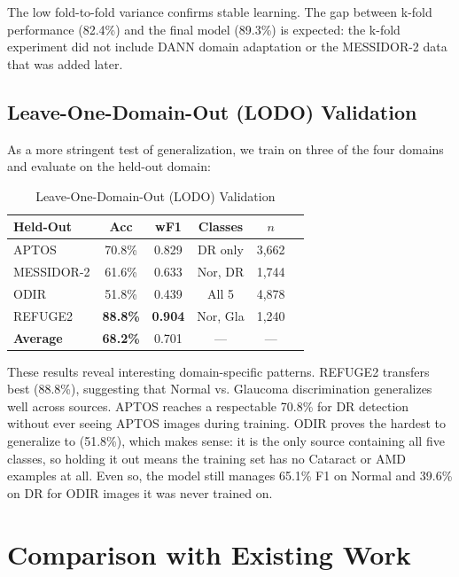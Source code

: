 \documentclass[conference]{IEEEtran}
\begin{document}
\noindent The low fold-to-fold variance confirms stable learning. The gap between k-fold performance (82.4\%) and the final model (89.3\%) is expected: the k-fold experiment did not include DANN domain adaptation or the MESSIDOR-2 data that was added later.

\subsection{Leave-One-Domain-Out (LODO) Validation}

As a more stringent test of generalization, we train on three of the four domains and evaluate on the held-out domain:

\begin{table}[h]
\centering
\caption{Leave-One-Domain-Out (LODO) Validation}
\label{tab:lodo}
\begin{tabular}{lccccr}
\toprule
\textbf{Held-Out} & \textbf{Acc} & \textbf{wF1} & \textbf{Classes} & \textbf{$n$} \\
\midrule
APTOS & 70.8\% & 0.829 & DR only & 3,662 \\
MESSIDOR-2 & 61.6\% & 0.633 & Nor, DR & 1,744 \\
ODIR & 51.8\% & 0.439 & All 5 & 4,878 \\
REFUGE2 & \textbf{88.8\%} & \textbf{0.904} & Nor, Gla & 1,240 \\
\midrule
\textbf{Average} & \textbf{68.2\%} & 0.701 & --- & --- \\
\bottomrule
\end{tabular}
\end{table}

\noindent These results reveal interesting domain-specific patterns. REFUGE2 transfers best (88.8\%), suggesting that Normal vs. Glaucoma discrimination generalizes well across sources. APTOS reaches a respectable 70.8\% for DR detection without ever seeing APTOS images during training. ODIR proves the hardest to generalize to (51.8\%), which makes sense: it is the only source containing all five classes, so holding it out means the training set has no Cataract or AMD examples at all. Even so, the model still manages 65.1\% F1 on Normal and 39.6\% on DR for ODIR images it was never trained on.

\section{Comparison with Existing Work}
\end{document}
